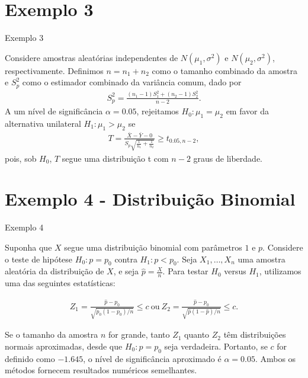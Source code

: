 \documentclass[12pt]{beamer}
\begin{document}
\section{Exemplo 3}
\begin{frame}{Exemplo 3}
\vspace{-0.2cm}
\begin{block}{}
\justifying
Considere amostras aleatórias independentes de $N(\mu_1, \sigma^2)$ e $N(\mu_2, \sigma^2)$, respectivamente. Definimos $n = n_1 + n_2$ como o tamanho combinado da amostra e $S_{p}^2$ como o estimador combinado da variância comum, dado por
\begin{align*}
S_{p}^2 = \frac{(n_1 - 1)S_1^2 + (n_2 - 1)S_2^2}{n - 2}.
\end{align*}
A um nível de significância $\alpha = 0.05$, rejeitamos $H_0 : \mu_1 = \mu_2$ em favor da alternativa unilateral $H_1 : \mu_1 > \mu_2$ se
\begin{align*}
T = \frac{\bar{X} - \bar{Y} - 0}{S_p\sqrt{\frac{1}{n_1} + \frac{1}{n_2}}}  \geq t_{0.05, n-2},
\end{align*}
pois, sob $H_0$, $T$ segue uma distribuição t com $n - 2$ graus de liberdade.
\end{block}
\end{frame}

\section{Exemplo 4 - Distribuição Binomial}
\begin{frame}{Exemplo 4}
\begin{block}{}
\justifying
Suponha que $X$ segue uma distribuição binomial com parâmetros $1$ e $p$. Considere o teste de hipótese $H_0 : p = p_0$ contra $H_1 : p < p_0$. Seja $X_1, \ldots, X_n$ uma amostra aleatória da distribuição de $X$, e seja $\hat{p} = \frac{X}{n}$. Para testar $H_0$ versus $H_1$, utilizamos uma das seguintes estatísticas:

\begin{align*}
Z_1 = \frac{\hat{p} - p_0}{\sqrt{p_0(1 - p_0)/n}} \leq c~\text{ou}~Z_2 = \frac{\hat{p}-p_0}{\sqrt{\hat{p}(1 - \hat{p})/n}} \leq c.
\end{align*}

Se o tamanho da amostra $n$ for grande, tanto $Z_1$ quanto $Z_2$ têm distribuições normais aproximadas, desde que $H_0 : p = p_0$ seja verdadeira. Portanto, se $c$ for definido como $-1.645$, o nível de significância aproximado é $\alpha = 0.05$. Ambos os métodos fornecem resultados numéricos semelhantes.
\end{block}
\end{frame}
\end{document}
